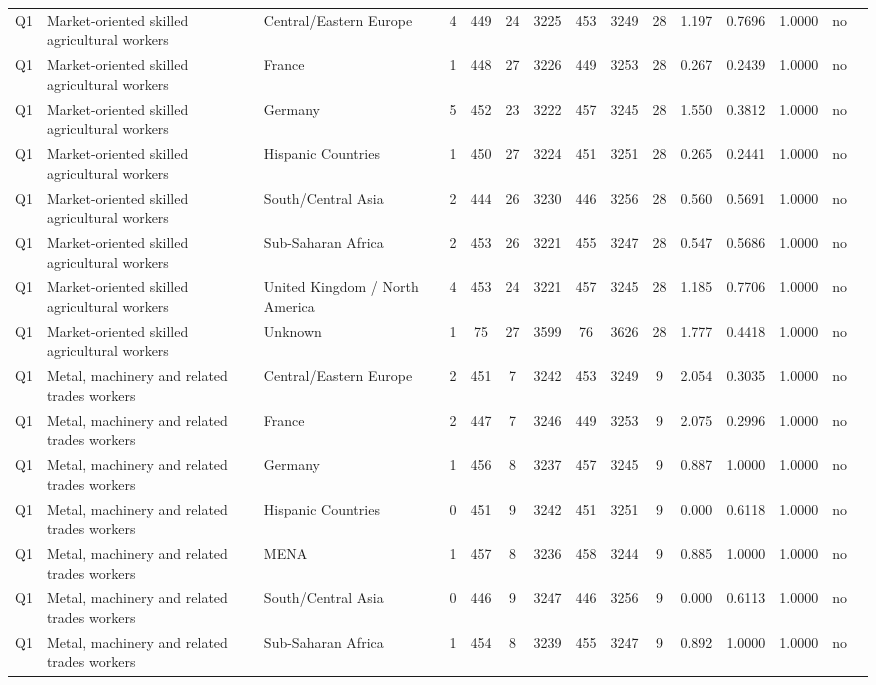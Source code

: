\begin{longtable}{lllrcccccccccll}
Q1 & Market-oriented skilled agricultural workers & Central/Eastern Europe & 4 & 449 & 24 & 3225 & 453 & 3249 & 28 & 1.197 & 0.7696 & 1.0000 & no \\
Q1 & Market-oriented skilled agricultural workers & France & 1 & 448 & 27 & 3226 & 449 & 3253 & 28 & 0.267 & 0.2439 & 1.0000 & no \\
Q1 & Market-oriented skilled agricultural workers & Germany & 5 & 452 & 23 & 3222 & 457 & 3245 & 28 & 1.550 & 0.3812 & 1.0000 & no \\
Q1 & Market-oriented skilled agricultural workers & Hispanic Countries & 1 & 450 & 27 & 3224 & 451 & 3251 & 28 & 0.265 & 0.2441 & 1.0000 & no \\
Q1 & Market-oriented skilled agricultural workers & South/Central Asia & 2 & 444 & 26 & 3230 & 446 & 3256 & 28 & 0.560 & 0.5691 & 1.0000 & no \\
Q1 & Market-oriented skilled agricultural workers & Sub-Saharan Africa & 2 & 453 & 26 & 3221 & 455 & 3247 & 28 & 0.547 & 0.5686 & 1.0000 & no \\
Q1 & Market-oriented skilled agricultural workers & United Kingdom / North America & 4 & 453 & 24 & 3221 & 457 & 3245 & 28 & 1.185 & 0.7706 & 1.0000 & no \\
Q1 & Market-oriented skilled agricultural workers & Unknown & 1 & 75 & 27 & 3599 & 76 & 3626 & 28 & 1.777 & 0.4418 & 1.0000 & no \\
Q1 & Metal, machinery and related trades workers & Central/Eastern Europe & 2 & 451 & 7 & 3242 & 453 & 3249 & 9 & 2.054 & 0.3035 & 1.0000 & no \\
Q1 & Metal, machinery and related trades workers & France & 2 & 447 & 7 & 3246 & 449 & 3253 & 9 & 2.075 & 0.2996 & 1.0000 & no \\
Q1 & Metal, machinery and related trades workers & Germany & 1 & 456 & 8 & 3237 & 457 & 3245 & 9 & 0.887 & 1.0000 & 1.0000 & no \\
Q1 & Metal, machinery and related trades workers & Hispanic Countries & 0 & 451 & 9 & 3242 & 451 & 3251 & 9 & 0.000 & 0.6118 & 1.0000 & no \\
Q1 & Metal, machinery and related trades workers & MENA & 1 & 457 & 8 & 3236 & 458 & 3244 & 9 & 0.885 & 1.0000 & 1.0000 & no \\
Q1 & Metal, machinery and related trades workers & South/Central Asia & 0 & 446 & 9 & 3247 & 446 & 3256 & 9 & 0.000 & 0.6113 & 1.0000 & no \\
Q1 & Metal, machinery and related trades workers & Sub-Saharan Africa & 1 & 454 & 8 & 3239 & 455 & 3247 & 9 & 0.892 & 1.0000 & 1.0000 & no \\

\end{longtable}
